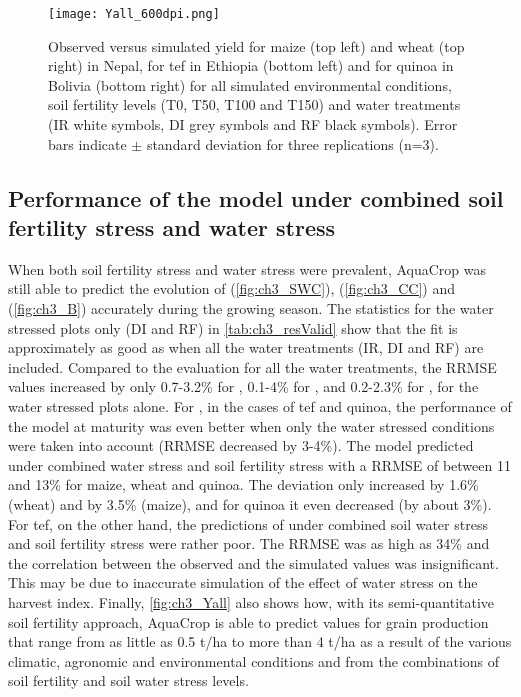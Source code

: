 \begin{figure}[tbhp]
	\centering
		\texttt{[image: Yall\_600dpi.png]}
	\caption{Observed versus simulated yield for maize (top left) and wheat (top right) in Nepal, for tef in Ethiopia (bottom left) and for quinoa in Bolivia (bottom right) for all simulated environmental conditions, soil fertility levels (T0, T50, T100 and T150) and water treatments (IR white symbols, DI grey symbols and RF black symbols). Error bars indicate $\pm$ standard deviation for three replications (n=3).}
	\label{fig:ch3_Yall}
\end{figure}

\subsection{Performance of the model under combined soil fertility stress and water stress}
When both soil fertility stress and water stress were prevalent, AquaCrop was still able to predict the evolution of \SWCr (\autoref{fig:ch3_SWC}), \CC (\autoref{fig:ch3_CC}) and \B (\autoref{fig:ch3_B}) accurately during the growing season. The statistics for the water stressed plots only (DI and RF) in \autoref{tab:ch3_resValid} show that the fit is approximately as good as when all the water treatments (IR, DI and RF) are included. Compared to the evaluation for all the water treatments, the RRMSE values increased by only 0.7-3.2\% for \SWCr, 0.1-4\% for \CC, and 0.2-2.3\% for \B, for the water stressed plots alone. For \B, in the cases of tef and quinoa, the performance of the model at maturity was even better when only the water stressed conditions were taken into account (RRMSE decreased by 3-4\%). The model predicted \Y under combined water stress and soil fertility stress with a RRMSE of between 11 and 13\% for maize, wheat and quinoa. The deviation only increased by 1.6\% (wheat) and by 3.5\% (maize), and for quinoa it even decreased (by about 3\%). For tef, on the other hand, the predictions of \Y under combined soil water stress and soil fertility stress were rather poor. The RRMSE was as high as 34\% and the correlation between the observed and the simulated values was insignificant. This may be due to inaccurate simulation of the effect of water stress on the harvest index. Finally, \autoref{fig:ch3_Yall} also shows how, with its semi-quantitative soil fertility approach, AquaCrop is able to predict values for grain production that range from as little as 0.5 \si{t/ha} to more than 4 \si{t/ha} as a result of the various climatic, agronomic and environmental conditions and from the combinations of soil fertility and soil water stress levels.

